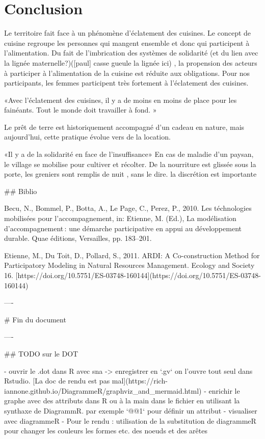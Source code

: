 \section{Conclusion}

Le territoire fait face à un phénomène d’éclatement des cuisines. Le concept de cuisine regroupe les personnes qui mangent ensemble et donc qui participent à l’alimentation. Du fait de l’imbrication des systèmes de solidarité (et du lien avec la lignée maternelle?)([paul] casse gueule la lignée ici) , la propension des acteurs à participer à l’alimentation de la cuisine est réduite aux obligations. Pour nos participants, les femmes participent très fortement à l’éclatement des cuisines.

«Avec l’éclatement des cuisines, il y a de moins en moins de place pour les fainéants. Tout le monde doit travailler à fond. »


Le prêt de terre est historiquement accompagné d’un cadeau en nature, mais aujourd’hui, cette pratique évolue vers de la location.

«Il y a de la solidarité en face de l’insuffisance»
En cas de maladie d’un paysan, le village se mobilise pour cultiver et récolter.
De la nourriture est glissée sous la porte, les greniers sont remplis de nuit , sans le dire.
la discrétion est importante


## Biblio

Becu, N., Bommel, P., Botta, A., Le Page, C., Perez, P., 2010. Les téchnologies mobilisées pour l’accompagnement, in: Etienne, M. (Ed.), La modélisation d’accompagnement : une démarche participative en appui au développement durable. Quae éditions, Versailles, pp. 183–201.

Etienne, M., Du Toit, D., Pollard, S., 2011. ARDI: A Co-construction Method for Participatory Modeling in Natural Resources Management. Ecology and Society 16. [https://doi.org/10.5751/ES-03748-160144](https://doi.org/10.5751/ES-03748-160144)

----

# Fin du document 

----

## TODO sur le DOT



- ouvrir le .dot dans R avec sna -> enregistrer en `.gv` on l'ouvre tout seul dans Rstudio. [La doc de rendu est pas mal](https://rich-iannone.github.io/DiagrammeR/graphviz_and_mermaid.html)
- enrichir le graphe avec des attributs dans R ou à la main dans le fichier en utilisant la synthaxe de DiagrammR. par exemple `@@1` pour définir un attribut 
- visualiser avec diagrammeR
- Pour le rendu : utilisation de la substitution de diagrammeR pour changer les couleurs les formes etc.  des noeuds et des arêtes

